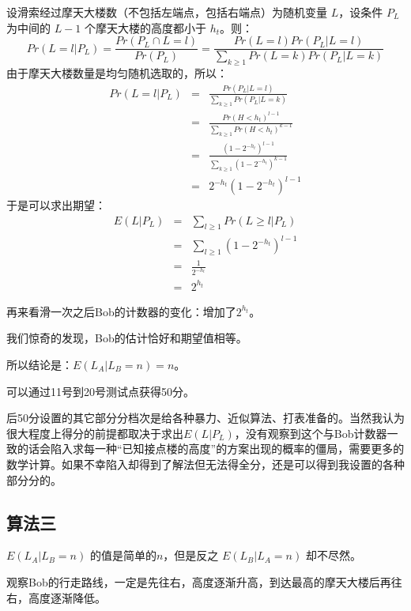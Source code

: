 \documentclass[11pt, a4paper]{article}
\begin{document}
设滑索经过摩天大楼数（不包括左端点，包括右端点）为随机变量 $L$，设条件 $P_L$ 为中间的 $L - 1$ 个摩天大楼的高度都小于 $h_t$。则：
\begin{equation}
Pr(L = l | P_L) = \frac{Pr(P_L \cap L = l)}{Pr(P_L)} = \frac{Pr(L = l) Pr(P_L | L = l)}{\sum_{k \geq 1}{Pr(L = k) Pr(P_L | L = k)}}
\end{equation}
由于摩天大楼数量是均匀随机选取的，所以：
\begin{eqnarray}
Pr(L = l | P_L) & = & \frac{Pr(P_L | L = l)}{\sum_{k \geq 1}{Pr(P_L | L = k)}}\\
                & = & \frac{Pr(H < h_t)^{l - 1}}{\sum_{k \geq 1}{Pr(H < h_t)^{k - 1}}}\\
                & = & \frac{(1 - 2^{-h_t})^{l - 1}}{\sum_{k \geq 1}{(1 - 2^{-h_t})^{k - 1}}}\\
                & = & 2^{-h_t}(1 - 2^{-h_t})^{l - 1}
\end{eqnarray}
于是可以求出期望：
\begin{eqnarray}
E(L | P_L) & = & \sum_{l \geq 1}{Pr(L \geq l | P_L)}\\
           & = & \sum_{l \geq 1}{(1 - 2^{-h_t})^{l - 1}}\\
           & = & \frac{1}{2^{-h_t}}\\
           & = & 2^{h_t}
\end{eqnarray}

再来看滑一次之后Bob的计数器的变化：增加了$2^{h_t}$。

我们惊奇的发现，Bob的估计恰好和期望值相等。

所以结论是：$E(L_A | L_B = n) = n$。

可以通过11号到20号测试点获得50分。

后50分设置的其它部分分档次是给各种暴力、近似算法、打表准备的。当然我认为很大程度上得分的前提都取决于求出$E(L | P_L)$，没有观察到这个与Bob计数器一致的话会陷入求每一种``已知接点楼的高度''的方案出现的概率的僵局，需要更多的数学计算。如果不幸陷入却得到了解法但无法得全分，还是可以得到我设置的各种部分分的。

\subsection*{算法三}
$E(L_A | L_B = n)$ 的值是简单的$n$，但是反之 $E(L_B | L_A = n)$ 却不尽然。

观察Bob的行走路线，一定是先往右，高度逐渐升高，到达最高的摩天大楼后再往右，高度逐渐降低。
\end{document}
